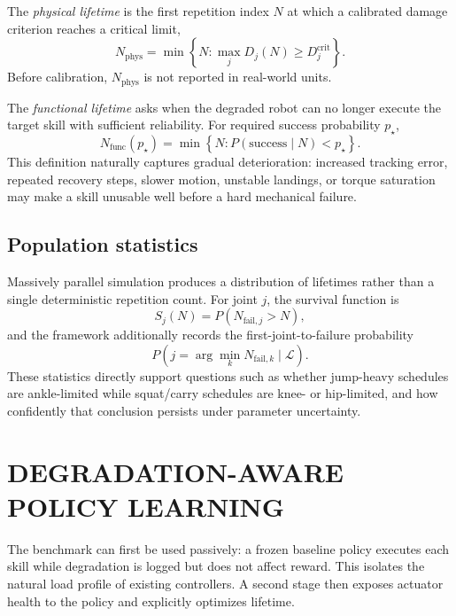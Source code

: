 \documentclass[letterpaper,10pt,conference]{ieeeconf}
\begin{document}
The \emph{physical lifetime} is the first repetition index $N$ at which a calibrated damage criterion reaches a critical limit,
\begin{equation}
N_{\mathrm{phys}}=
\min\left\{N:\max_j D_j(N)\ge D_j^{\mathrm{crit}}\right\}.
\label{eq:physicalrul}
\end{equation}
Before calibration, $N_{\mathrm{phys}}$ is not reported in real-world units.

The \emph{functional lifetime} asks when the degraded robot can no longer execute the target skill with sufficient reliability. For required success probability $p_\star$,
\begin{equation}
N_{\mathrm{func}}(p_\star)=
\min\left\{N:
P(\mathrm{success}\mid N)<p_\star\right\}.
\label{eq:functionalrul}
\end{equation}
This definition naturally captures gradual deterioration: increased tracking error, repeated recovery steps, slower motion, unstable landings, or torque saturation may make a skill unusable well before a hard mechanical failure.

\subsection{Population statistics}

Massively parallel simulation produces a distribution of lifetimes rather than a single deterministic repetition count. For joint $j$, the survival function is
\begin{equation}
S_j(N)=P(N_{\mathrm{fail},j}>N),
\label{eq:survival}
\end{equation}
and the framework additionally records the first-joint-to-failure probability
\begin{equation}
P\left(j=\arg\min_k N_{\mathrm{fail},k}\mid\mathcal{L}\right).
\label{eq:firstfailure}
\end{equation}
These statistics directly support questions such as whether jump-heavy schedules are ankle-limited while squat/carry schedules are knee- or hip-limited, and how confidently that conclusion persists under parameter uncertainty.

\section{DEGRADATION-AWARE POLICY LEARNING}

The benchmark can first be used passively: a frozen baseline policy executes each skill while degradation is logged but does not affect reward. This isolates the natural load profile of existing controllers. A second stage then exposes actuator health to the policy and explicitly optimizes lifetime.
\end{document}
